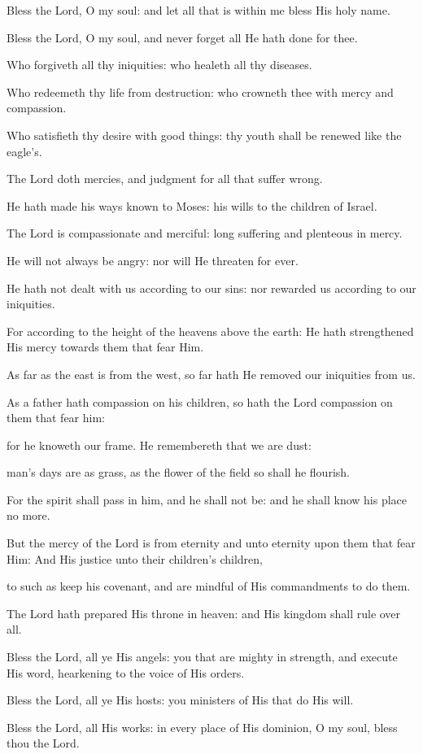 \begin{psalmmode}
Bless the Lord, O my soul: and let all
    that is within me bless His holy name.

   Bless the Lord, O my soul, and never forget all He hath
    done for thee.

   Who forgiveth all thy iniquities: who healeth all thy
    diseases.

   Who redeemeth thy life from destruction: who crowneth thee
    with mercy and compassion.

   Who satisfieth thy desire with good things: thy youth
    shall be renewed like the eagle's.

   The Lord doth mercies, and judgment for all that suffer
    wrong.

   He hath made his ways known to Moses: his wills to the
    children of Israel.

   The Lord is compassionate and merciful: long suffering and
    plenteous in mercy.

   He will not always be angry: nor will He threaten for
    ever.

  He hath not dealt with us according to our sins: nor
    rewarded us according to our iniquities.

  For according to the height of the heavens above the earth:
    He hath strengthened His mercy towards them that fear Him.

  As far as the east is from the west, so far hath He
    removed our iniquities from us.

  As a father hath compassion on his children, so hath the
    Lord compassion on them that fear him:

  for he knoweth our frame. He remembereth that we are dust:

  man's days are as grass, as the flower of the field so
    shall he flourish.

  For the spirit shall pass in him, and he shall not be: and
    he shall know his place no more.

  But the mercy of the Lord is from eternity and unto
    eternity upon them that fear Him: And His justice unto their
    children's children,

  to such as keep his covenant, and are mindful of His
    commandments to do them.

  The Lord hath prepared His throne in heaven: and His
    kingdom shall rule over all.

  Bless the Lord, all ye His angels: you that are mighty in
    strength, and execute His word, hearkening to the voice of
    His orders.

  Bless the Lord, all ye His hosts: you ministers of His
    that do His will.

  Bless the Lord, all His works: in every place of His
    dominion, O my soul, bless thou the Lord.

\end{psalmmode}

